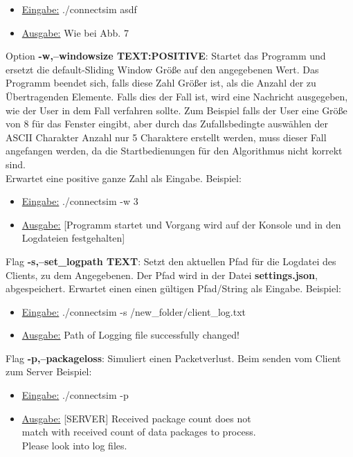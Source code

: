 \documentclass{article}
\begin{document}
\begin{itemize}
	\item \underline{Eingabe:} ./connectsim asdf
	\item \underline{Ausgabe:} Wie bei Abb. 7\newline 
\end{itemize}

Option \textbf{-w,--windowsize TEXT:POSITIVE}:\newline
Startet das Programm und ersetzt die default-Sliding Window Größe auf den angegebenen Wert. Das Programm beendet sich, falls diese Zahl Größer ist, als die Anzahl der zu Übertragenden Elemente. Falls dies der Fall ist, wird eine Nachricht ausgegeben, wie der User in dem Fall verfahren sollte. Zum Beispiel falls der User eine Größe von 8 für das Fenster eingibt, aber durch das Zufallsbedingte auswählen der ASCII Charakter Anzahl nur 5 Charaktere erstellt werden, muss dieser Fall angefangen werden, da die Startbedienungen für den Algorithmus nicht korrekt sind.\\
Erwartet eine positive ganze Zahl als Eingabe.
Beispiel: 
\begin{itemize}
	\item \underline{Eingabe:} ./connectsim -w 3
	\item \underline{Ausgabe:} [Programm startet und Vorgang wird auf der Konsole und in den Logdateien festgehalten]
\end{itemize}

\break

Flag \textbf{-s,--set\_logpath TEXT}:\newline
Setzt den aktuellen Pfad für die Logdatei des Clients, zu dem Angegebenen. Der Pfad wird in der Datei \textbf{settings.json}, abgespeichert.
Erwartet einen einen gültigen Pfad/String als Eingabe.
Beispiel: 
\begin{itemize}
	\item \underline{Eingabe:} ./connectsim -s /new\_folder/client\_log.txt
	\item \underline{Ausgabe:} 
Path of Logging file successfully changed!\\
\end{itemize}

Flag \textbf{-p,--packageloss}:\newline
Simuliert einen Packetverlust. Beim senden vom Client zum Server
Beispiel: 
\begin{itemize}
	\item \underline{Eingabe:} ./connectsim -p
	\item \underline{Ausgabe:} [SERVER] Received package count does not\\ match with received count of data packages to process.
	\\ Please look into log files.\\
\end{itemize}
\end{document}
